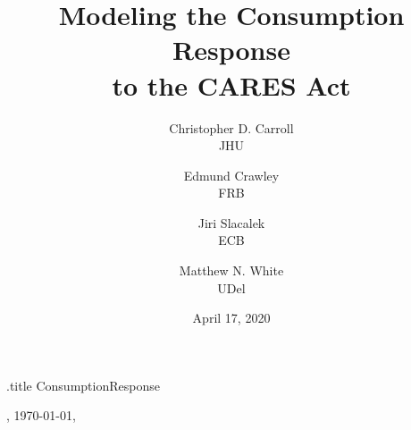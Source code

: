 \documentclass[titlepage]{\econtex}
\renewcommand{\forcedate}{April 17, 2020}
\begin{document}


\begin{verbatimwrite}{\jobname.title}
  ConsumptionResponse
\end{verbatimwrite}

\hfill{\tiny \jobname, \today, \currenttime}

\title{Modeling the Consumption Response\\ to the CARES Act}

{
  \author{
    Christopher D. Carroll\authNum \\ {\small JHU}
    \and
    Edmund Crawley\authNum   \\ {\small FRB}
    \and
    Jiri Slacalek\authNum    \\ {\small ECB}
    \and
    Matthew N. White\authNum \\ {\small UDel}
  }
} %



\date{\forcedate}
\maketitle
\end{document}
